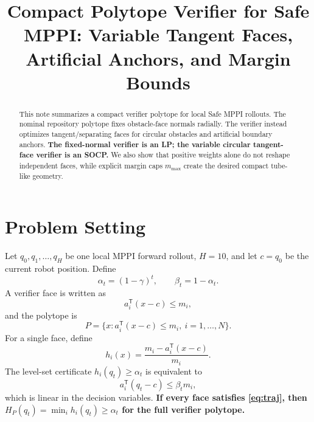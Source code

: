 \documentclass[conference]{IEEEtran}
\title{Compact Polytope Verifier for Safe MPPI: Variable Tangent Faces, Artificial Anchors, and Margin Bounds}
\author{\IEEEauthorblockN{Safe Flow Expansion / Pillar 3 Working Note}}
\newcommand{\trans}{^{\mathsf T}}
\begin{document}
\maketitle

\begin{abstract}
This note summarizes a compact verifier polytope for local Safe MPPI rollouts. The nominal repository polytope fixes obstacle-face normals radially. The verifier instead optimizes tangent/separating faces for circular obstacles and artificial boundary anchors. \textbf{The fixed-normal verifier is an LP; the variable circular tangent-face verifier is an SOCP.} We also show that positive weights alone do not reshape independent faces, while explicit margin caps $m_{\max}$ create the desired compact tube-like geometry.
\end{abstract}

\section{Problem Setting}
Let $q_0,q_1,\ldots,q_H$ be one local MPPI forward rollout, $H=10$, and let $c=q_0$ be the current robot position.  Define
\begin{equation}
    \alpha_t=(1-\gamma)^t,\qquad \beta_t=1-\alpha_t.
\end{equation}
A verifier face is written as
\begin{equation}
    a_i\trans(x-c)\le m_i,
\end{equation}
and the polytope is
\begin{equation}
    P=\{x:a_i\trans(x-c)\le m_i,\ i=1,\ldots,N\}.
\end{equation}
For a single face, define
\begin{equation}
    h_i(x)=\frac{m_i-a_i\trans(x-c)}{m_i}.
\end{equation}
The level-set certificate $h_i(q_t)\ge\alpha_t$ is equivalent to
\begin{equation}
    a_i\trans(q_t-c)\le\beta_t m_i,
    \label{eq:traj}
\end{equation}
which is linear in the decision variables. \textbf{If every face satisfies \eqref{eq:traj}, then $H_P(q_t)=\min_i h_i(q_t)\ge\alpha_t$ for the full verifier polytope.}
\end{document}
